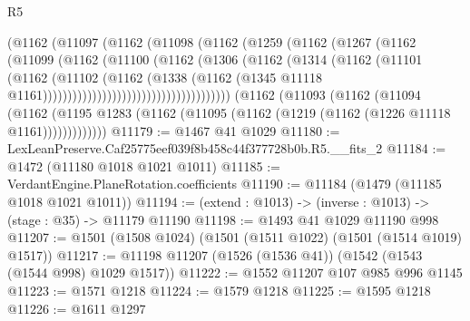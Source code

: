 \begin{lexlean}{R5}
\begin{coremodule}
                                  (@1162
                                    (@11097
                                      (@1162
                                        (@11098
                                          (@1162
                                            (@1259
                                              (@1162
                                                (@1267
                                                  (@1162
                                                    (@11099
                                                      (@1162
                                                        (@11100
                                                          (@1162
                                                            (@1306
                                                              (@1162
                                                                (@1314
                                                                  (@1162
                                                                    (@11101
                                                                      (@1162
                                                                        (@11102
                                                                          (@1162
                                                                            (@1338
                                                                              (@1162
                                                                                (@1345
                                                                                  @11118
                                                                                  @1161))))))))))))))))))))))))))))))))))))))
      (@1162
        (@11093
          (@1162
            (@11094
              (@1162
                (@1195 @1283 (@1162 (@11095 (@1162 (@1219 (@1162 (@1226 @11118 @1161)))))))))))))
@11179 := @1467 @41 @1029
@11180 := LexLeanPreserve.Caf25775eef039f8b458c44f377728b0b.R5.__fits_2
@11184 := @1472 (@11180 @1018 @1021 @1011)
@11185 := VerdantEngine.PlaneRotation.coefficients
@11190 := @11184 (@1479 (@11185 @1018 @1021 @1011))
@11194 := (extend : @1013) -> (inverse : @1013) -> (stage : @35) -> @11179 @11190
@11198 := @1493 @41 @1029 @11190 @998
@11207 := @1501 (@1508 @1024) (@1501 (@1511 @1022) (@1501 (@1514 @1019) @1517))
@11217 := @11198 @11207 (@1526 (@1536 @41)) (@1542 (@1543 (@1544 @998) @1029 @1517))
@11222 := @1552 @11207 @107 @985 @996 @1145
@11223 := @1571 @1218
@11224 := @1579 @1218
@11225 := @1595 @1218
@11226 := @1611 @1297

\end{coremodule}
\end{lexlean}
